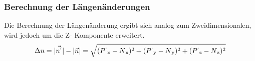 \documentclass[a4paper, 12pt]{article}
\begin{document}
			\subsubsection{Berechnung der Längenänderungen}
				Die Berechnung der Längenänderung ergibt sich analog zum Zweidimensionalen, wird jedoch um die Z- Komponente erweitert.
				\begin{align}
					\Delta n =
					|\vec{n^{'}}|-|\vec{n}|=
					\sqrt	{
							(P^{`}\textsubscript{x}-N\textsubscript{x})^2+
							(P^{`}\textsubscript{y}-N\textsubscript{y})^2+
							(P^{`}\textsubscript{z}-N\textsubscript{z})^2
							}
				\end{align}
\end{document}
